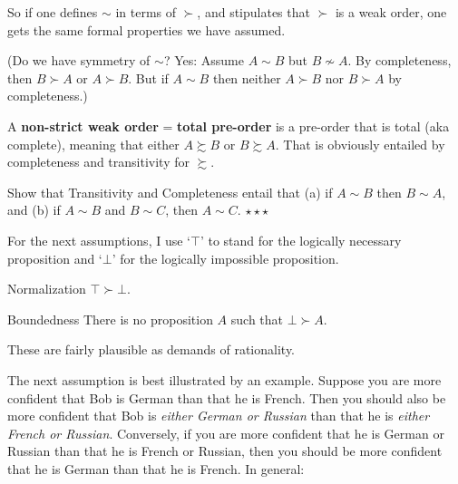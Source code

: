 {  So if one defines $\sim$ in terms of $\succ$, and stipulates that
  $\succ$ is a weak order, one gets the same formal properties we
  have assumed. 

  (Do we have symmetry of $\sim$? Yes: Assume $A \sim B$ but $B
  \not\sim A$. By completeness, then $B \succ A$ or $A \succ B$. But
  if $A \sim B$ then neither $A \succ B$ nor $B \succ A$ by
  completeness.)

  A \textbf{non-strict weak order} = \textbf{total pre-order} is a
  pre-order that is total (aka complete), meaning that either $A
  \succsim B$ or $B \succsim A$. That is obviously entailed by
  completeness and transitivity for $\succsim$.

} %

\begin{exercise}
  Show that Transitivity and Completeness entail that (a) if $A \sim
  B$ then $B \sim A$, and (b) if $A \sim B$ and $B \sim C$, then $A
  \sim C$. $\star\star\star$
\end{exercise}


For the next assumptions, I use `$\top$' to stand for the logically
necessary proposition and `$\bot$' for the logically impossible
proposition.
%
\begin{genericthm}{Normalization}
  $\top \succ \bot$.
\end{genericthm}
\vspace{-2mm}
\begin{genericthm}{Boundedness}
  There is no proposition $A$ such that $\bot \succ A$.
\end{genericthm}
These are fairly plausible as demands of rationality. 

The next assumption is best illustrated by an example. Suppose you are
more confident that Bob is German than that he is French.  Then you
should also be more confident that Bob is \emph{either German or
  Russian} than that he is \emph{either French or
  Russian}. Conversely, if you are more confident that he is German or
Russian than that he is French or Russian, then you should be more
confident that he is German than that he is French. In general:

